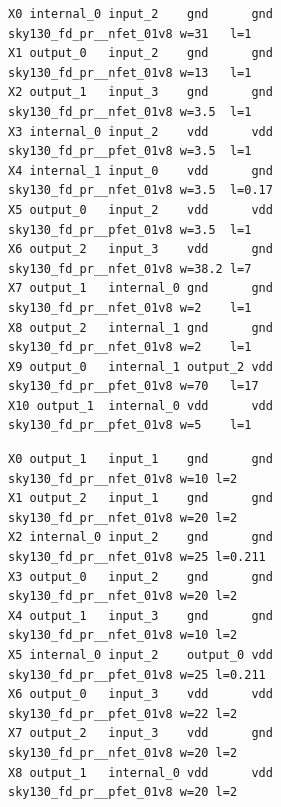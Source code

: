 \documentclass[sigconf,pbalance]{acmart_modified}
\begin{document}
\clearpage

\begin{figure}[H]
\begin{prompt}
\footnotesize
\begin{Verbatim}
X0 internal_0 input_2    gnd      gnd sky130_fd_pr__nfet_01v8 w=31   l=1
X1 output_0   input_2    gnd      gnd sky130_fd_pr__nfet_01v8 w=13   l=1
X2 output_1   input_3    gnd      gnd sky130_fd_pr__nfet_01v8 w=3.5  l=1
X3 internal_0 input_2    vdd      vdd sky130_fd_pr__pfet_01v8 w=3.5  l=1
X4 internal_1 input_0    vdd      gnd sky130_fd_pr__nfet_01v8 w=3.5  l=0.17
X5 output_0   input_2    vdd      vdd sky130_fd_pr__pfet_01v8 w=3.5  l=1
X6 output_2   input_3    vdd      gnd sky130_fd_pr__nfet_01v8 w=38.2 l=7
X7 output_1   internal_0 gnd      gnd sky130_fd_pr__nfet_01v8 w=2    l=1
X8 output_2   internal_1 gnd      gnd sky130_fd_pr__nfet_01v8 w=2    l=1
X9 output_0   internal_1 output_2 vdd sky130_fd_pr__pfet_01v8 w=70   l=17
X10 output_1  internal_0 vdd      vdd sky130_fd_pr__pfet_01v8 w=5    l=1
\end{Verbatim}
\end{prompt}

\vspace{0.2cm}

\begin{prompt}
\footnotesize
\begin{Verbatim}
X0 output_1   input_1    gnd      gnd sky130_fd_pr__nfet_01v8 w=10 l=2
X1 output_2   input_1    gnd      gnd sky130_fd_pr__nfet_01v8 w=20 l=2
X2 internal_0 input_2    gnd      gnd sky130_fd_pr__nfet_01v8 w=25 l=0.211
X3 output_0   input_2    gnd      gnd sky130_fd_pr__nfet_01v8 w=20 l=2
X4 output_1   input_3    gnd      gnd sky130_fd_pr__nfet_01v8 w=10 l=2
X5 internal_0 input_2    output_0 vdd sky130_fd_pr__pfet_01v8 w=25 l=0.211
X6 output_0   input_3    vdd      vdd sky130_fd_pr__pfet_01v8 w=22 l=2
X7 output_2   input_3    vdd      gnd sky130_fd_pr__nfet_01v8 w=20 l=2
X8 output_1   internal_0 vdd      vdd sky130_fd_pr__pfet_01v8 w=20 l=2
\end{Verbatim}
\end{prompt}

\vspace{0.2cm}


\end{figure}
\end{document}
